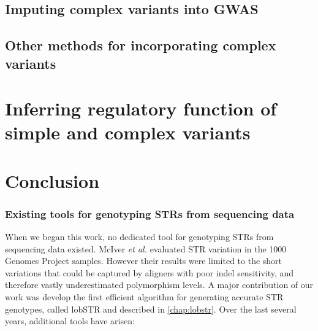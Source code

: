 \subsection{Imputing complex variants into GWAS}

\subsection{Other methods for incorporating complex variants}

\section{Inferring regulatory function of simple and complex variants}

\section{Conclusion}






\subsubsection{Existing tools for genotyping STRs from sequencing data}
When we began this work, no dedicated tool for genotyping STRs from sequencing data existed. McIver \emph{et al.} \cite{McIverFondonSkinnerEtAl2011} evaluated STR variation in the 1000 Genomes Project \cite{AbecasisAltshulerAutonEtAl2010} samples. However their results were limited to the short variations that could be captured by aligners with poor indel sensitivity, and therefore vastly underestimated polymorphism levels. A major contribution of our work was develop the first efficient algorithm for generating accurate STR genotypes, called lobSTR \cite{GymrekGolanRossetEtAl2012} and described in \autoref{chap:lobstr}. Over the last several years, additional tools have arisen:

